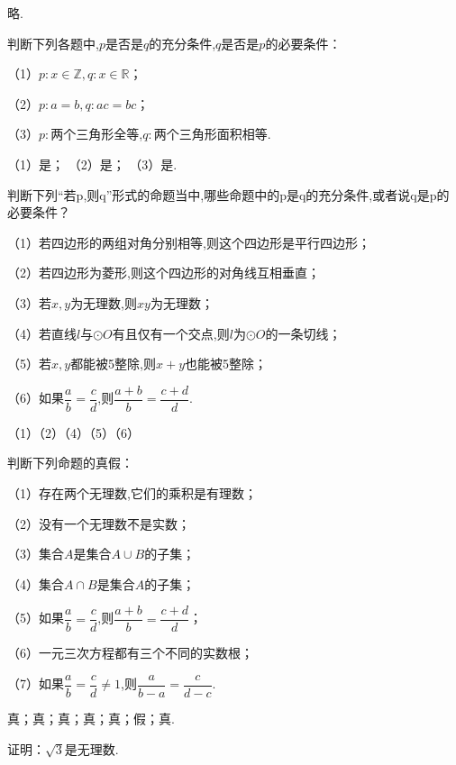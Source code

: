 \documentclass[lang=cn,newtx,10pt,scheme=chinese]{elegantbook}
\begin{document}
\begin{solution}
  略.
\end{solution}
\begin{exercise}\label{202406262010}
  判断下列各题中,$p$是否是$q$的充分条件,$q$是否是$p$的必要条件：

  （1）$p:x\in\mathbb{Z},q:x\in\mathbb{R}$；

  （2）$p:a=b,q:ac=bc$；

  （3）$p:$两个三角形全等,$q:$两个三角形面积相等.
\end{exercise}
\begin{solution}
  （1）是；
  （2）是；
  （3）是.
\end{solution}
\begin{exercise}\label{202406262101}
  判断下列“若p,则q”形式的命题当中,哪些命题中的p是q的充分条件,或者说q是p的必要条件？

  （1）若四边形的两组对角分别相等,则这个四边形是平行四边形；

  （2）若四边形为菱形,则这个四边形的对角线互相垂直；

  （3）若$x,y$为无理数,则$xy$为无理数；

  （4）若直线$l$与$\odot O$有且仅有一个交点,则$l$为$\odot O$的一条切线；

  （5）若$x,y$都能被5整除,则$x+y$也能被5整除；

  （6）如果$\dfrac{a}{b}=\dfrac{c}{d}$,则$\dfrac{a+b}{b}=\dfrac{c+d}{d}$.
\end{exercise}
\begin{solution}
  （1）（2）（4）（5）（6）
\end{solution}
\begin{exercise}\label{RJB_P26}
  判断下列命题的真假：

  （1）存在两个无理数,它们的乘积是有理数；

  （2）没有一个无理数不是实数；

  （3）集合$A$是集合$A\cup B$的子集；

  （4）集合$A\cap B$是集合$A$的子集；

  （5）如果$\dfrac ab=\dfrac cd$,则$\dfrac{a+b}b=\dfrac{c+d}{d}$；

  （6）一元三次方程都有三个不同的实数根；
  
  （7）如果$\dfrac ab=\dfrac cd\neq 1$,则$\dfrac a{b-a}=\dfrac c{d-c}$.
\end{exercise}
\begin{solution}
  真；真；真；真；真；假；真.
\end{solution}
\begin{exercise}\label{202407081520}
  证明：$\sqrt{3}$是无理数.
\end{exercise}
\end{document}
